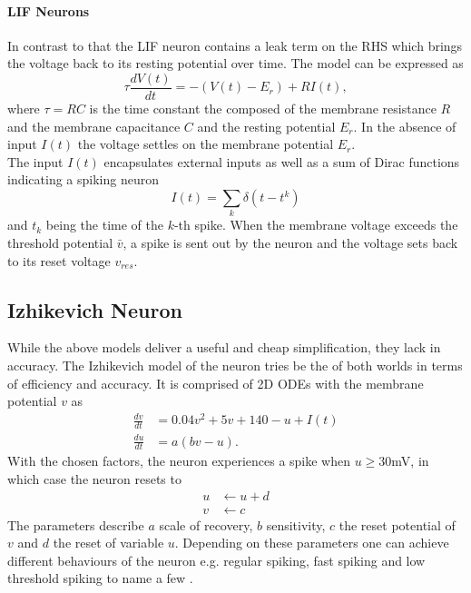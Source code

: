 \paragraph{\ac{LIF} Neurons}
In contrast to that the \ac{LIF} neuron contains a leak term on the RHS which brings the voltage back to its resting potential over time. The model can be expressed as
\begin{equation}
	\tau\frac{dV(t)}{dt} = -(V(t)-E_r) + RI(t),
\end{equation}
where $\tau = RC$ is the time constant the composed of the membrane resistance $R$ and the membrane capacitance $C$ and the resting potential $E_r$. In the absence of input $I(t)$ the voltage settles on the membrane potential $E_r$.\\
The input $I(t)$ encapsulates external inputs as well as a sum of Dirac functions indicating a spiking neuron
\begin{equation}
	I(t) = \sum_k \delta(t-t^k)
\end{equation}
and $t_k$ being the time of the $k$-th spike. When the membrane voltage exceeds the threshold potential $\bar{v}$, a spike is sent out by the neuron and the voltage sets back to its reset voltage $v_{res}$.
\subsection{Izhikevich Neuron}
While the above models deliver a useful and cheap simplification, they lack in accuracy. The Izhikevich model \cite{izhikevich_simple_2003} of the neuron tries be the of both worlds in terms of efficiency and accuracy. It is comprised of 2D ODEs with the membrane potential $v$ as
\begin{equation}
	\begin{aligned}
	\frac{d v}{dt} &= 0.04v^2 + 5v + 140 -u +I(t)\\
	\frac{d u}{dt} &= a(bv-u).
	\end{aligned}
\end{equation}
With the chosen factors, the neuron experiences a spike when $u\geq30 $mV, in which case the neuron resets to
\begin{equation}
\begin{aligned}
	u &\leftarrow u+d\\
	v&\leftarrow c
\end{aligned}
\end{equation}
The parameters describe $a$ scale of recovery, $b$ sensitivity, $c$ the reset potential of $v$ and $d$ the reset of variable $u$. Depending on these parameters one can achieve different behaviours of the neuron e.g. regular spiking, fast spiking and low threshold spiking to name a few \cite{izhikevich_simple_2003}.



